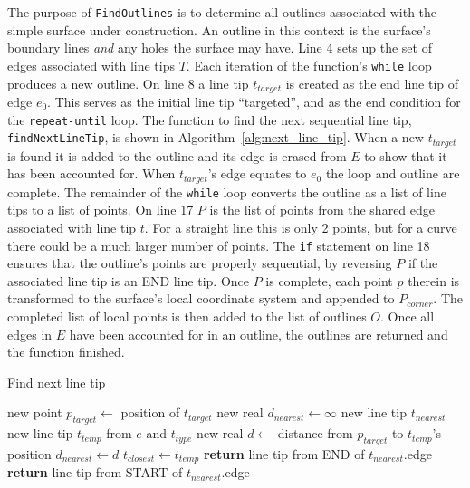 The purpose of \verb|FindOutlines| is to determine all outlines associated with the simple surface under construction.
An outline in this context is the surface's boundary lines \textit{and} any holes the surface may have.
Line 4 sets up the set of edges associated with line tips $T$.
Each iteration of the function's \verb|while| loop produces a new outline.
On line 8 a line tip $t_{target}$ is created as the end line tip of edge $e_0$.
This serves as the initial line tip ``targeted'', and as the end condition for the \verb|repeat-until| loop.
The function to find the next sequential line tip, \verb|findNextLineTip|, is shown in Algorithm~\ref{alg:next_line_tip}.
When a new $t_{target}$ is found it is added to the outline and its edge is erased from $E$ to show that it has been accounted for.
When $t_{target}$'s edge equates to $e_0$ the loop and outline are complete.
The remainder of the \verb|while| loop converts the outline as a list of line tips to a list of points.
On line 17 $P$ is the list of points from the shared edge associated with line tip $t$.
For a straight line this is only 2 points, but for a curve there could be a much larger number of points.
The \verb|if| statement on line 18 ensures that the outline's points are properly sequential, by reversing $P$ if the associated line tip is an END line tip.
Once $P$ is complete, each point $p$ therein	is transformed to the surface's local coordinate system and appended to $P_{corner}$.
The completed list of local points is then added to	the list of outlines $O$.
Once all edges in $E$ have been accounted for in an outline, the outlines are returned and the function finished.

\begin{algorithm}[htb]
	\caption{Find next line tip}\label{alg:next_line_tip}
\begin{algorithmic}[1]
	\State new point $p_{target} \leftarrow$ position of $t_{target}$
	\State new real $d_{nearest} \leftarrow \infty$
	\State new line tip $t_{nearest}$
			\State new line tip $t_{temp}$ from $e$ and $t_{type}$
			\State new real $d \leftarrow$ distance from $p_{target}$ to $t_{temp}$'s position
				\State $d_{nearest} \leftarrow d$
				\State $t_{closest} \leftarrow t_{temp}$
			\EndIf
		\EndFor
	\EndFor
		\State \textbf{return} line tip from END of $t_{nearest}$.edge
	\Else
		\State \textbf{return} line tip from START of $t_{nearest}$.edge
	\EndIf
\EndFunction
\end{algorithmic}
\end{algorithm}

